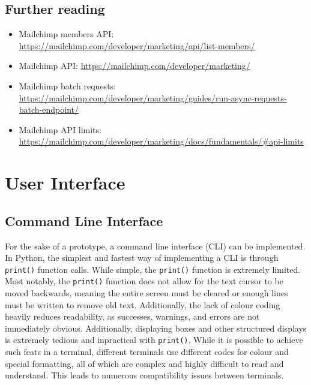 \documentclass[11pt]{article}
\begin{document}
\inputminted[linenos=true]{python}{mailchimp_examples/add_or_update_member.py}

\subsection{Further reading}

\begin{itemize}
    \item Mailchimp members API: \url{https://mailchimp.com/developer/marketing/api/list-members/}
    \item Mailchimp API: \url{https://mailchimp.com/developer/marketing/}
    \item Mailchimp batch requests: \url{https://mailchimp.com/developer/marketing/guides/run-async-requests-batch-endpoint/}
    \item Mailchimp API limits: \url{https://mailchimp.com/developer/marketing/docs/fundamentals/#api-limits}
\end{itemize}

\newpage

\section{User Interface}

\subsection{Command Line Interface}

For the sake of a prototype, a command line interface (CLI) can be implemented. In Python, the simplest and fastest way of implementing a CLI is through \texttt{print()} function calls. While simple, the \texttt{print()} function is extremely limited. Most notably, the \texttt{print()} function does not allow for the text cursor to be moved backwards, meaning the entire screen must be cleared or enough lines must be written to remove old text. Additionally, the lack of colour coding heavily reduces readability, as successes, warnings, and errors are not immediately obvious. Additionally, displaying boxes and other structured displays is extremely tedious and inpractical with \texttt{print()}. While it is possible to achieve such feats in a terminal, different terminals use different codes for colour and special formatting, all of which are complex and highly difficult to read and understand. This leads to numerous compatibility issues between terminals.
\end{document}
